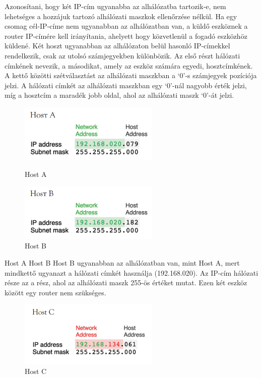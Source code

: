 Azonosítani, hogy két IP-cím ugyanabba az alhálózatba tartozik-e, nem lehetséges 
a hozzájuk tartozó alhálózati maszkok ellenőrzése nélkül.
Ha egy csomag cél-IP-címe nem ugyanabban az alhálózatban van,
a küldő eszköznek a router IP-címére kell irányítania, ahelyett hogy
közvetlenül a fogadó eszközhöz küldené. 
Két hoszt ugyanabban az alhálózaton belül hasonló IP-címekkel rendelkezik, csak az utolsó számjegyekben
különbözik. Az első részt hálózati címkének nevezik, a másodikat, amely az
eszköz számára egyedi, hosztcímkének. A kettő közötti szétválasztást az
alhálózati maszkban a `0'-s számjegyek pozíciója jelzi.
A hálózati címkét az alhálózati maszkban egy `0'-nál nagyobb érték jelzi,
míg a hosztcím a maradék jobb oldal, ahol az alhálózati maszk `0'-át jelzi.
\begin{figure}[H]
    \centering
    \begin{minipage}{0.45\textwidth}
        \centering
        \includegraphics[width=67mm, keepaspectratio]{figures/host_a.png}
        \caption{Host A}
    \end{minipage}\hfill
    \begin{minipage}{0.45\textwidth}
        \centering
        \includegraphics[width=67mm, keepaspectratio]{figures/host_b.png}
        \caption{Host B}
    \end{minipage}
\end{figure}
Host A Host B  Host B ugyanabban az alhálózatban van,
mint Host A, mert mindkettő ugyanazt a hálózati címkét használja (192.168.020).
Az IP-cím hálózati része az a rész, ahol az alhálózati maszk 255-ös értéket
mutat. Ezen két eszköz között egy router nem szükséges. 
\begin{figure}[H]
	\centering
	\includegraphics[width=67mm, keepaspectratio]{figures/host_c.png}
	\caption{Host C}
	\label {fig:host_c}
\end{figure}
